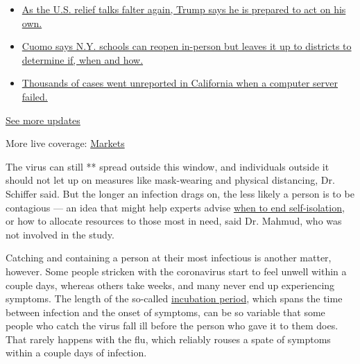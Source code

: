 \begin{itemize}
\tightlist
\item
  \href{https://www.nytimes.com/2020/08/07/world/covid-19-news.html?action=click\&pgtype=Article\&state=default\&region=MAIN_CONTENT_1\&context=storylines_live_updates\#link-1f86d03a}{As
  the U.S. relief talks falter again, Trump says he is prepared to act
  on his own.}
\item
  \href{https://www.nytimes.com/2020/08/07/world/covid-19-news.html?action=click\&pgtype=Article\&state=default\&region=MAIN_CONTENT_1\&context=storylines_live_updates\#link-3f64a70a}{Cuomo
  says N.Y. schools can reopen in-person but leaves it up to districts
  to determine if, when and how.}
\item
  \href{https://www.nytimes.com/2020/08/07/world/covid-19-news.html?action=click\&pgtype=Article\&state=default\&region=MAIN_CONTENT_1\&context=storylines_live_updates\#link-14e70066}{Thousands
  of cases went unreported in California when a computer server failed.}
\end{itemize}

\href{https://www.nytimes.com/2020/08/07/world/covid-19-news.html?action=click\&pgtype=Article\&state=default\&region=MAIN_CONTENT_1\&context=storylines_live_updates}{See
more updates}

More live coverage:
\href{https://www.nytimes.com/live/2020/08/07/business/stock-market-today-coronavirus?action=click\&pgtype=Article\&state=default\&region=MAIN_CONTENT_1\&context=storylines_live_updates}{Markets}

The virus can still ** spread outside this window, and individuals
outside it should not let up on measures like mask-wearing and physical
distancing, Dr. Schiffer said. But the longer an infection drags on, the
less likely a person is to be contagious --- an idea that might help
experts advise
\href{https://www.nytimes.com/2020/07/22/health/coronavirus-isolation-testing.html}{when
to end self-isolation}, or how to allocate resources to those most in
need, said Dr. Mahmud, who was not involved in the study.

Catching and containing a person at their most infectious is another
matter, however. Some people stricken with the coronavirus start to feel
unwell within a couple days, whereas others take weeks, and many never
end up experiencing symptoms. The length of the so-called
\href{https://advances.sciencemag.org/content/early/2020/08/07/sciadv.abc1202}{incubation
period}, which spans the time between infection and the onset of
symptoms, can be so variable that some people who catch the virus fall
ill before the person who gave it to them does. That rarely happens with
the flu, which reliably rouses a spate of symptoms within a couple days
of infection.

